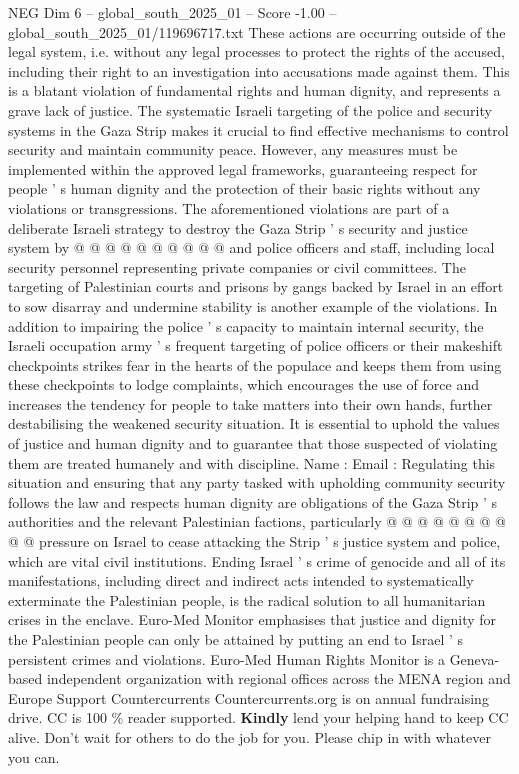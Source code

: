 \begin{textsample}{NEG Dim 6 – global\_south\_2025\_01 – Score -1.00 – global\_south\_2025\_01/119696717.txt}
These actions are occurring outside of the legal system, i.e. without any legal processes to protect the rights of the accused, including their right to an investigation into accusations made against them.
This is a blatant violation of fundamental rights and human dignity, and represents a grave lack of justice.
The systematic Israeli targeting of the police and security systems in the Gaza Strip makes it crucial to find effective mechanisms to control security and maintain community peace.
However, any measures must be implemented within the approved legal frameworks, guaranteeing respect for people ' s human dignity and the protection of their basic rights without any violations or transgressions.
The aforementioned violations are part of a deliberate Israeli strategy to destroy the Gaza Strip ' s security and justice system by @ @ @ @ @ @ @ @ @ @ and police officers and staff, including local security personnel representing private companies or civil committees.
The targeting of Palestinian courts and prisons by gangs backed by Israel in an effort to sow disarray and undermine stability is another example of the violations.
In addition to impairing the police ' s capacity to maintain internal security, the Israeli occupation army ' s frequent targeting of police officers or their makeshift checkpoints strikes fear in the hearts of the populace and keeps them from using these checkpoints to lodge complaints, which encourages the use of force and increases the tendency for people to take matters into their own hands, further destabilising the weakened security situation.
It is essential to uphold the values of justice and human dignity and to guarantee that those suspected of violating them are treated humanely and with discipline.
Name : Email : Regulating this situation and ensuring that any party tasked with upholding community security follows the law and respects human dignity are obligations of the Gaza Strip ' s authorities and the relevant Palestinian factions, particularly @ @ @ @ @ @ @ @ @ @ pressure on Israel to cease attacking the Strip ' s justice system and police, which are vital civil institutions.
Ending Israel ' s crime of genocide and all of its manifestations, including direct and indirect acts intended to systematically exterminate the Palestinian people, is the radical solution to all humanitarian crises in the enclave.
Euro-Med Monitor emphasises that justice and dignity for the Palestinian people can only be attained by putting an end to Israel ' s persistent crimes and violations.
Euro-Med Human Rights Monitor is a Geneva-based independent organization with regional offices across the MENA region and Europe Support Countercurrents Countercurrents.org is on annual fundraising drive.
CC is 100 \% reader supported. \textbf{Kindly} lend your helping hand to keep CC alive.
Don't wait for others to do the job for you.
Please chip in with whatever you can.

\end{textsample}
